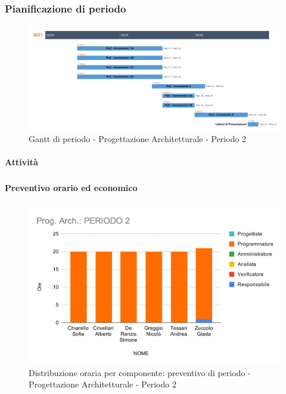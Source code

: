 \subsubsection{Pianificazione di periodo}

\begin{figure}[H]
	\centering
	\includegraphics[scale=0.37]{res/images/gantt_periodo/progarch_2_gantt.png}
	\caption{Gantt di periodo - Progettazione Architetturale - Periodo 2}
\end{figure}

\paragraph{Attività}
\subparagraph*{}

\planningTable{
	
}


\paragraph{Preventivo orario ed economico}
\subparagraph*{}

\contabilitaTable{
	
}

\begin{figure}[H]
	\centering
	\includegraphics[scale=2]{res/images/charts/preventivo/prog_arch_2.png}
	\caption{Distribuzione oraria per componente: preventivo di periodo - Progettazione Architetturale - Periodo 2}
\end{figure}

